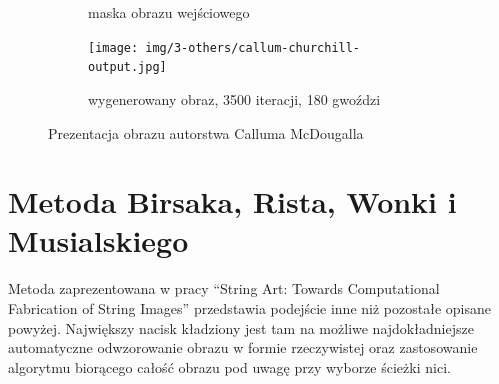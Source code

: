 \documentclass[a4paper, 12pt, polish, twoside]{extreport}
\begin{document}
\begin{figure}[H]
\begin{subfigure}{0.32\textwidth}
            \caption{maska obrazu wejściowego}
            \label{others-callum-output-b}
        \end{subfigure}
        \begin{subfigure}{0.32\textwidth}
            \centering
            \texttt{[image: img/3-others/callum-churchill-output.jpg]}
            \caption{wygenerowany obraz, 3500 iteracji, 180 gwoździ}
            \label{others-callum-output-c}
        \end{subfigure}
        \caption{Prezentacja obrazu autorstwa Calluma McDougalla}
        \label{others-callum-output}
        \end{figure}
        
    \section{Metoda Birsaka, Rista, Wonki i Musialskiego} \label{others-birsak}
    Metoda zaprezentowana w pracy ``String Art: Towards Computational Fabrication of String Images'' \cite{article-string-art-birsak} przedstawia podejście inne niż pozostałe opisane powyżej. Największy nacisk kładziony jest tam na możliwe najdokładniejsze automatyczne odwzorowanie obrazu w formie rzeczywistej oraz zastosowanie algorytmu biorącego całość obrazu pod uwagę przy wyborze ścieżki nici. 
    
\end{document}

